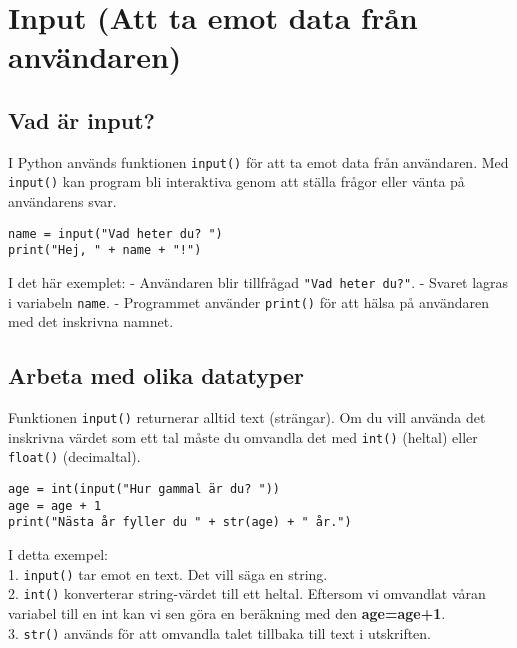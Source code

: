 

\section{Input (Att ta emot data från användaren)}
\label{section:input}

\subsection{Vad är input?}
I Python används funktionen \texttt{input()} för att ta emot data från användaren. Med \texttt{input()} kan program bli interaktiva genom att ställa frågor eller vänta på användarens svar.

\begin{lstlisting}[title=Exempel på input]
name = input("Vad heter du? ")
print("Hej, " + name + "!")
\end{lstlisting}

I det här exemplet:
- Användaren blir tillfrågad \texttt{"Vad heter du?"}.
- Svaret lagras i variabeln \texttt{name}.
- Programmet använder \texttt{print()} för att hälsa på användaren med det inskrivna namnet.



\subsection{Arbeta med olika datatyper}
Funktionen \texttt{input()} returnerar alltid text (strängar). Om du vill använda det inskrivna värdet som ett tal måste du omvandla det med \texttt{int()} (heltal) eller \texttt{float()} (decimaltal).

\begin{lstlisting}[title=Exempel på input med tal]
age = int(input("Hur gammal är du? "))
age = age + 1
print("Nästa år fyller du " + str(age) + " år.")
\end{lstlisting}

I detta exempel:\\
1. \texttt{input()} tar emot en text. Det vill säga en string. \\
2. \texttt{int()} konverterar string-värdet till ett heltal. 
Eftersom vi omvandlat våran variabel till en int kan vi sen göra en beräkning med den \textbf{age=age+1}.\\
3. \texttt{str()} används för att omvandla talet tillbaka till text i utskriften.\\

